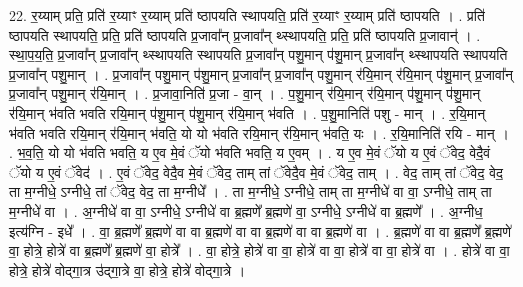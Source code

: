 \documentclass[17pt]{extarticle}
\begin{document}
22. र॒य्याम् प्रति॒ प्रति॑ र॒य्याꣳ र॒य्याम् प्रति॑ ष्ठापयति स्थापयति॒ प्रति॑ र॒य्याꣳ र॒य्याम् प्रति॑ ष्ठापयति । . प्रति॑ ष्ठापयति स्थापयति॒ प्रति॒ प्रति॑ ष्ठापयति प्र॒जावा᳚न् प्र॒जावा᳚न् थ्स्थापयति॒ प्रति॒ प्रति॑ ष्ठापयति प्र॒जावान्॑ । . स्था॒प॒य॒ति॒ प्र॒जावा᳚न् प्र॒जावा᳚न् थ्स्थापयति स्थापयति प्र॒जावा᳚न् पशु॒मान् प॑शु॒मान् प्र॒जावा᳚न् थ्स्थापयति स्थापयति प्र॒जावा᳚न् पशु॒मान् । . प्र॒जावा᳚न् पशु॒मान् प॑शु॒मान् प्र॒जावा᳚न् प्र॒जावा᳚न् पशु॒मान् र॑यि॒मान् र॑यि॒मान् प॑शु॒मान् प्र॒जावा᳚न् प्र॒जावा᳚न् पशु॒मान् र॑यि॒मान् । . प्र॒जावा॒निति॑ प्र॒जा - वा॒न् । . प॒शु॒मान् र॑यि॒मान् र॑यि॒मान् प॑शु॒मान् प॑शु॒मान् र॑यि॒मान् भ॑वति भवति रयि॒मान् प॑शु॒मान् प॑शु॒मान् र॑यि॒मान् भ॑वति । . प॒शु॒मानिति॑ पशु - मान् । . र॒यि॒मान् भ॑वति भवति रयि॒मान् र॑यि॒मान् भ॑वति॒ यो यो भ॑वति रयि॒मान् र॑यि॒मान् भ॑वति॒ यः । . र॒यि॒मानिति॑ रयि - मान् । . भ॒व॒ति॒ यो यो भ॑वति भवति॒ य ए॒व मे॒वं ॅयो भ॑वति भवति॒ य ए॒वम् । . य ए॒व मे॒वं ॅयो य ए॒वं ॅवेद॒ वेदै॒वं ॅयो य ए॒वं ॅवेद॑ । . ए॒वं ॅवेद॒ वेदै॒व मे॒वं ॅवेद॒ ताम् तां ॅवेदै॒व मे॒वं ॅवेद॒ ताम् । . वेद॒ ताम् तां ॅवेद॒ वेद॒ ता म॒ग्नीधे॒ ऽग्नीधे॒ तां ॅवेद॒ वेद॒ ता म॒ग्नीधे᳚ । . ता म॒ग्नीधे॒ ऽग्नीधे॒ ताम् ता म॒ग्नीधे॑ वा वा॒ ऽग्नीधे॒ ताम् ता म॒ग्नीधे॑ वा । . अ॒ग्नीधे॑ वा वा॒ ऽग्नीधे॒ ऽग्नीधे॑ वा ब्र॒ह्मणे᳚ ब्र॒ह्मणे॑ वा॒ ऽग्नीधे॒ ऽग्नीधे॑ वा ब्र॒ह्मणे᳚ । . अ॒ग्नीध॒ इत्य॑ग्नि - इधे᳚ । . वा॒ ब्र॒ह्मणे᳚ ब्र॒ह्मणे॑ वा वा ब्र॒ह्मणे॑ वा वा ब्र॒ह्मणे॑ वा वा ब्र॒ह्मणे॑ वा । . ब्र॒ह्मणे॑ वा वा ब्र॒ह्मणे᳚ ब्र॒ह्मणे॑ वा॒ होत्रे॒ होत्रे॑ वा ब्र॒ह्मणे᳚ ब्र॒ह्मणे॑ वा॒ होत्रे᳚ । . वा॒ होत्रे॒ होत्रे॑ वा वा॒ होत्रे॑ वा वा॒ होत्रे॑ वा वा॒ होत्रे॑ वा । . होत्रे॑ वा वा॒ होत्रे॒ होत्रे॑ वोद्‍गा॒त्र उ॑द्‍गा॒त्रे वा॒ होत्रे॒ होत्रे॑ वोद्‍गा॒त्रे । \newline
\end{document}
